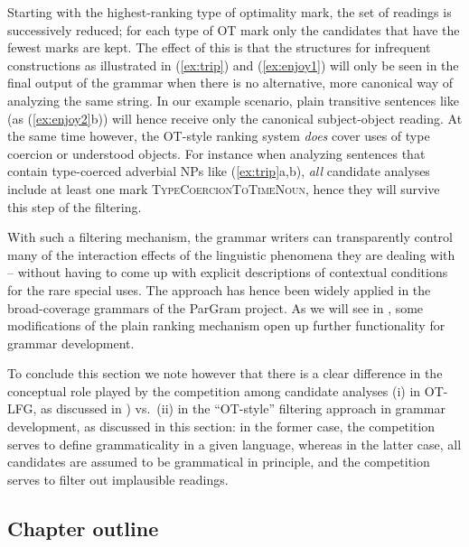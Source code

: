 \documentclass[output=paper,hidelinks]{langscibook}
\begin{document}
Starting with the highest-ranking type of optimality mark, the set of readings is successively reduced; for each type of OT mark only the candidates that have the fewest marks are kept.  The effect of this is that the structures for infrequent constructions as illustrated in (\ref{ex:trip}) and (\ref{ex:enjoy1}) will only be seen in the final output of the grammar when there is no alternative, more canonical way of analyzing the same string. 
In our example scenario, plain transitive sentences like (as (\ref{ex:enjoy2}b)) will hence receive only the canonical subject-object reading.
At the same time however, the OT-style ranking system \emph{does} cover uses of type coercion or understood objects.  For instance when analyzing sentences that contain type-coerced adverbial NPs like (\ref{ex:trip}a,b), \emph{all} candidate analyses include at least one mark \textsc{TypeCoercionToTimeNoun}, hence they will survive this step of the filtering.


With such a filtering mechanism, the grammar writers can transparently control many of the interaction effects of the linguistic phenomena they are dealing with -- without having to come up with explicit descriptions of contextual conditions for the rare special uses. The approach has hence been widely applied in the broad-coverage grammars of the ParGram project.
As we will see in , some modifications of the plain ranking mechanism open up further functionality for grammar development.

To conclude this section we note however that there is a clear difference in the conceptual role played by the competition among candidate analyses (i) in OT-LFG, as discussed in ) vs.\ (ii) in the ``OT-style'' filtering approach in grammar development, as discussed in this section: in the former case, the competition serves to define grammaticality in a given language, whereas in the latter case, all candidates are assumed to be grammatical in principle, and the competition serves to filter out implausible readings.


\subsection{Chapter outline}
\label{sec:OT:chapter-outline}
\end{document}
